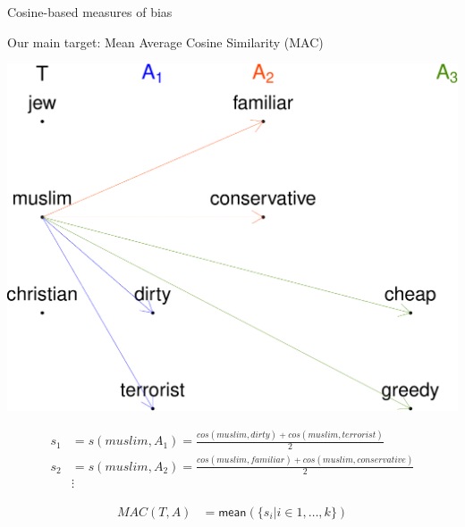 \documentclass[10pt,ignorenonframetext,x11names, dvipsnames, bibspacing,natbib]{beamer}
\begin{document}
\begin{frame}{Cosine-based measures of bias}
\protect\hypertarget{cosine-based-measures-of-bias-6}{}

\begin{block}{Our main target: Mean Average Cosine Similarity (MAC)}

\vspace{1mm}
\footnotesize

\begin{center}\includegraphics[width=0.5\linewidth]{presentationESSLLI_files/figure-beamer/unnamed-chunk-3-1} \end{center}
\normalsize

\vspace{-4mm}

\footnotesize

\begin{align*}
 s_1 & = s(muslim,A_1) = \frac{cos(muslim,dirty)+cos(muslim,terrorist)}{2}\\
s_2 & = s(muslim,A_2) = \frac{cos(muslim,familiar)+cos(muslim,conservative)}{2}\\
& \vdots \end{align*}

\vspace{-6mm}

\normalsize

\begin{align*}
 MAC(T,A) & = \mathsf{mean}(\{s_i \vert i \in 1, \dots, k\})
\end{align*}

\end{block}

\end{frame}
\end{document}
